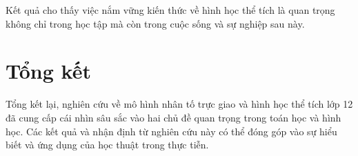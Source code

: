 Kết quả cho thấy việc nắm vững kiến thức về hình học thể tích là quan trọng không chỉ trong học tập mà còn trong cuộc sống và sự nghiệp sau này.

\section*{Tổng kết}

Tổng kết lại, nghiên cứu về mô hình nhân tố trực giao và hình học thể tích lớp 12 đã cung cấp cái nhìn sâu sắc vào hai chủ đề quan trọng trong toán học và hình học. Các kết quả và nhận định từ nghiên cứu này có thể đóng góp vào sự hiểu biết và ứng dụng của học thuật trong thực tiễn.
